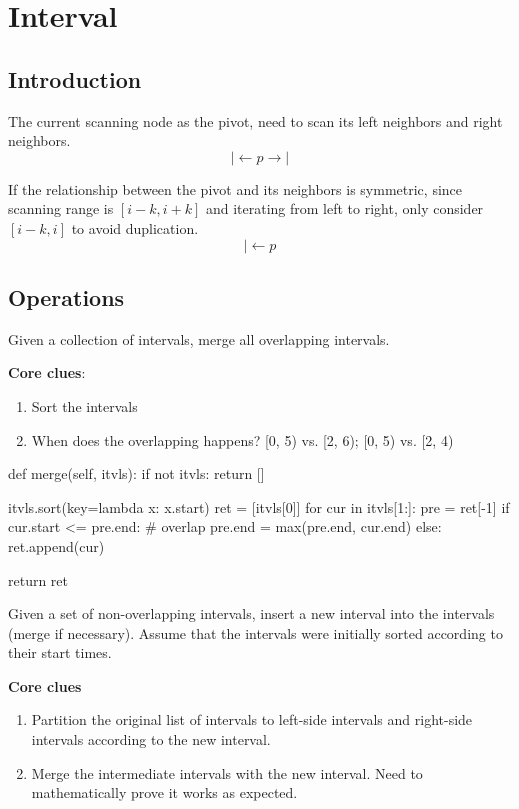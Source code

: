 \chapter{Interval}


\section{Introduction}
 The current scanning node as the pivot, need to scan its left neighbors and right neighbors. 
$$
|\leftarrow p \rightarrow |
$$

If the relationship between the pivot and its neighbors is symmetric, since scanning range is $[i-k, i+k]$ and iterating from left to right, only consider $[i-k, i]$ to avoid duplication.
$$
|\leftarrow p
$$

\section{Operations}
 Given a collection of intervals, merge all overlapping intervals.

\textbf{Core clues}:
\begin{enumerate}
\item Sort the intervals
\item When does the overlapping happens?
[0, 5) vs. [2, 6); [0, 5) vs. [2, 4)
\end{enumerate}
\begin{python}
def merge(self, itvls):
    if not itvls:
        return []

    itvls.sort(key=lambda x: x.start)
    ret = [itvls[0]]
    for cur in itvls[1:]:
        pre = ret[-1]
        if cur.start <= pre.end:  # overlap
            pre.end = max(pre.end, cur.end)
        else:
            ret.append(cur)

    return ret
\end{python}

 Given a set of non-overlapping intervals, insert a new interval into the intervals (merge if necessary). Assume that the intervals were initially sorted according to their start times.

\textbf{Core clues}
\begin{enumerate}
\item Partition the original list of intervals to left-side intervals and right-side intervals according to the new interval. 
\item Merge the intermediate intervals with the new interval. Need to mathematically prove it works as expected.
\end{enumerate}

